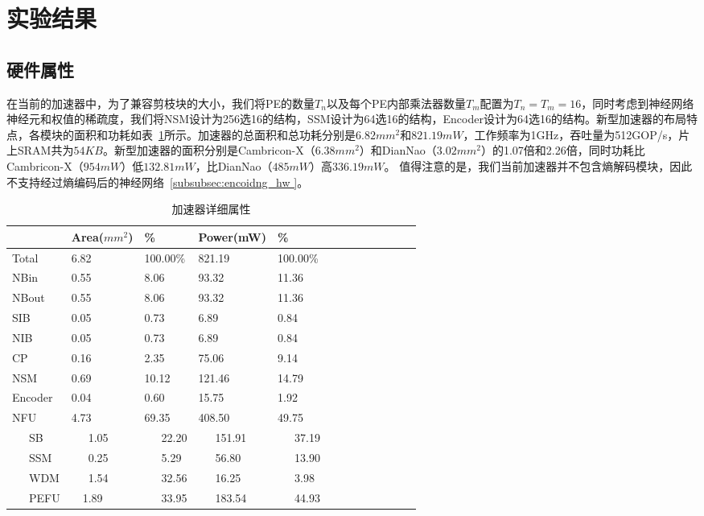 \section{实验结果}

\subsection{硬件属性}

在当前的加速器中，为了兼容剪枝块的大小，我们将PE的数量$T_n$以及每个PE内部乘法器数量$T_m$配置为$T_n = T_m = 16$，同时考虑到神经网络神经元和权值的稀疏度，我们将NSM设计为256选16的结构，SSM设计为64选16的结构，Encoder设计为64选16的结构。新型加速器的布局特点，各模块的面积和功耗如表~\ref{tab:hardware}所示。加速器的总面积和总功耗分别是$6.82mm^2$和$821.19mW$，工作频率为1GHz，吞吐量为512GOP/s，片上SRAM共为$54KB$。新型加速器的面积分别是Cambricon-X（$6.38mm^2$）和DianNao（$3.02mm^2$）的1.07倍和2.26倍，同时功耗比Cambricon-X（$954mW$）低$132.81mW$，比DianNao（$485mW$）高$336.19mW$。
值得注意的是，我们当前加速器并不包含熵解码模块，因此不支持经过熵编码后的神经网络~\ref{subsubsec:encoidng_hw }。

\begin{table}[h]
\caption{加速器详细属性}
\centering
\label{tab:hardware}
\begin{tabular}{lllllllllllll}
\toprule
 & Area($mm^2$) & \% & Power(mW) & \% \\
\midrule
Total   & 6.82	& 100.00\% 	& 821.19    & 100.00\% \\
\midrule
NBin    & 0.55  & 8.06		& 93.32     & 11.36	\\
NBout   & 0.55  & 8.06	    & 93.32     & 11.36	\\
SIB     & 0.05 	& 0.73		& 6.89      & 0.84	\\
NIB     & 0.05  & 0.73      & 6.89      & 0.84  \\
CP      & 0.16 	& 2.35		& 75.06     & 9.14	\\
NSM     & 0.69 	& 10.12		& 121.46    & 14.79	\\
Encoder & 0.04  & 0.60      & 15.75     & 1.92  \\
NFU     & 4.73 	& 69.35 	& 408.50    & 49.75	\\
~~~SB   & ~~~1.05 	& ~~~22.20	& ~~~151.91 & ~~~37.19\\
~~~SSM  & ~~~0.25 	& ~~~5.29	& ~~~56.80  & ~~~13.90	\\
~~~WDM  & ~~~1.54 	& ~~~32.56	& ~~~16.25  & ~~~3.98	\\
~~~PEFU & ~~1.89	& ~~~33.95	& ~~~183.54 & ~~~44.93 \\
\bottomrule
\end{tabular}
\end{table}

